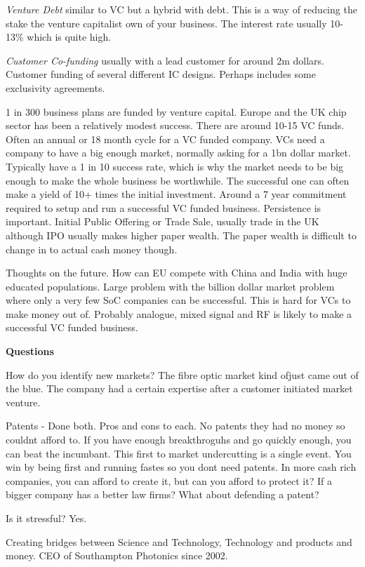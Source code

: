 \textit{Venture Debt} similar to VC but a hybrid with debt. This is a way of reducing the stake the venture capitalist own of your business. The interest rate usually 10-13\% which is quite high.

\textit{Customer Co-funding} usually with a lead customer for around 2m dollars. Customer funding of several different IC designs. Perhaps includes some exclusivity agreements.

1 in 300 business plans are funded by venture capital. Europe and the UK chip sector has been a relatively modest success. There are around 10-15 VC funds. Often an annual or 18 month cycle for a VC funded company. VCs need a company to have a big enough market, normally asking for a 1bn dollar market. Typically have a 1 in 10 success rate, which is why the market needs to be big enough to make the whole business be worthwhile. The successful one can often make a yield of 10+ times the initial investment. Around a 7 year commitment required to setup and run a successful VC funded business. Persistence is important. Initial Public Offering or Trade Sale, usually trade in the UK although IPO usually makes higher paper wealth. The paper wealth is difficult to change in to actual cash money though. 

Thoughts on the future. How can EU compete with China and India with huge educated populations. Large problem with the billion dollar market problem where only a very few SoC companies can be successful. This is hard for VCs to make money out of. Probably analogue, mixed signal and RF is likely to make a successful VC funded business.

\textbf{Questions}

How do you identify new markets? The fibre optic market kind ofjust came out of the blue. The company had a certain expertise after a customer initiated market venture.

Patents - Done both. Pros and cons to each. No patents they had no money so couldnt afford to. If you have enough breakthroguhs and go quickly enough, you can beat the incumbant. This first to market undercutting is a single event. You win by being first and running fastes so you dont need patents. In more cash rich companies, you can afford to create it, but can you afford to protect it? If a bigger company has a better law firms? What about defending a patent? 

Is it stressful? Yes.

Creating bridges between Science and Technology, Technology and products and money. CEO of Southampton Photonics since 2002. 

